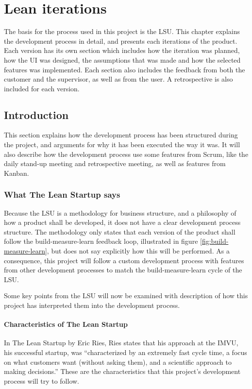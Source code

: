 \chapter{Lean iterations}
\label{chap:LeanStartup}
The basis for the process used in this project is the \gls{LSU}. This chapter explains the development process in detail, and presents each iterations of the product. Each version has its own section which includes how the iteration was planned, how the \gls{UI} was designed, the assumptions that was made and how the selected features was implemented. Each section also includes the feedback from both the customer and the supervisor, as well as from the user. A retrospective is also included for each version.

\section{Introduction}
This section explains how the development process has been structured during the project, and arguments for why it has been executed the way it was. It will also describe how the development process use some features from Scrum, like the daily stand-up meeting and retrospective meeting, as well as features from Kanban.

\subsection{What The Lean Startup says}
Because the \gls{LSU} is a methodology for business structure, and a philosophy of how a product shall be developed, it does not have a clear development process structure. The methodology only states that each version of the product shall follow the build-measure-learn feedback loop, illustrated in figure \ref{fig:build-measure-learn}, but does not say explicitly how this will be performed. As a consequence, this project will follow a custom development process with features from other development processes to match the build-measure-learn cycle of the \gls{LSU}. 

Some key points from the \gls{LSU} will now be examined with description of how this project has interpreted them into the development process.

\subsubsection{Characteristics of The Lean Startup}
In The Lean Startup by Eric Ries, Ries states that his approach at the IMVU, his successful startup, was “characterized by an extremely fast cycle time, a focus on what customers want (without asking them), and a scientific approach to making decisions.” \cite[p.~4]{lean-startup} These are the characteristics that this project’s development process will try to follow. 

